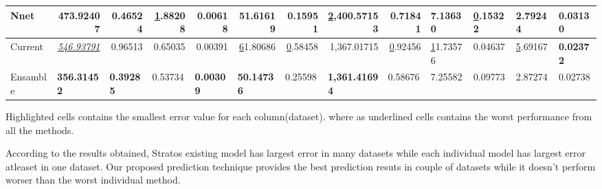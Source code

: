 \begin{table}[]
\begin{tabular}{@{}|l|r|r|r|r|r|r|r|r|l|l|l|l|@{}}
Nnet                                         & 473.92407                               & 0.46524                               & {\ul 1.88208}                & 0.00618                               & 51.61619                               & \textbf{0.15951}             & {\ul 2,400.57153}                         & 0.71841                      & \textbf{7.13630} & {\ul 0.15322}    & \textbf{2.79244} & 0.03130          \\ \midrule
Current                                      & {\ul \textit{546.93791}}                & 0.96513                               & 0.65035                      & 0.00391                               & {\ul 61.80686}                         & {\ul 0.58458}                & 1,367.01715                               & {\ul 0.92456}                & {\ul 11.73576}   & 0.04637          & {\ul 5.69167}    & \textbf{0.02372} \\ \midrule
Ensamble                                     & \multicolumn{1}{l|}{\textbf{356.31452}} & \multicolumn{1}{l|}{\textbf{0.39285}} & \multicolumn{1}{l|}{0.53734} & \multicolumn{1}{l|}{\textbf{0.00309}} & \multicolumn{1}{l|}{\textbf{50.14736}} & \multicolumn{1}{l|}{0.25598} & \multicolumn{1}{l|}{\textbf{1,361.41694}} & \multicolumn{1}{l|}{0.58676} & 7.25582          & 0.09773          & 2.87274          & 0.02738          \\ \bottomrule
\end{tabular}
\end{table}

Highlighted cells contains the smallest error value for each column(dataset). where as underlined cells contains the worst performance from all the methods. 

According to the results obtained, Stratos existing model has largest error in many datasets while each individual model has largest error atleaset in one dataset. Our proposed prediction technique provides the best prediction resuts in couple of datasets while it doesn't perform worser than the worst individual method. 
